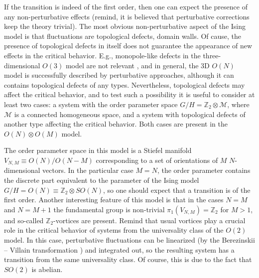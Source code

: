 \documentclass[final,twocolumn]{elsarticle}
\begin{document}
If the transition is indeed of the first order, then one can expect the presence of any non-perturbative effects (remind, it is believed that perturbative corrections keep the theory trivial). The most obvious non-perturbative aspect of the Ising model is that fluctuations are topological defects, domain walls. Of cause, the presence of topological defects in itself does not guarantee the appearance of new effects in the critical behavior. E.g., monopole-like defects in the three-dimensional $O(3)$ model are not relevant \cite{Cardy80,Antunes02}, and in general, the 3D $O(N)$ model is successfully described by perturbative approaches, although it can contains topological defects of any types. Nevertheless, topological defects may affect the critical behavior, and to test such a possibility it is useful to consider at least two cases: a system with the order parameter space $G/H=\mathbb{Z}_2\otimes \mathcal{M}$, where $\mathcal{M}$ is a connected homogeneous space, and a system with topological defects of another type affecting the critical behavior. Both cases are present in the $O(N)\otimes O(M)$ model.

The order parameter space in this model is a Stiefel manifold $V_{N,M}\equiv O(N)/O(N-M)$ corresponding to a set of orientations of $M$ $N$-dimensional vectors. In the particular case $M=N$, the order parameter contains the discrete part equivalent to the parameter of the Ising model $G/H=O(N)\equiv\mathbb{Z}_2\otimes SO(N)$, so one should expect that a transition is of the first order. Another interesting feature of this model is that in the cases $N=M$ and $N=M+1$ the fundamental group is non-trivial $\pi_1(V_{N,M})=\mathbb{Z}_2$ for $M>1$, and so-called $\mathbb{Z}_2$-vortices are present. Remind that usual vortices play a crucial role in the critical behavior of systems from the universality class of the $O(2)$ model. In this case, perturbative fluctuations can be linearized (by the Berezinskii -- Villain transformation \cite{Berezinsky70,Villain75,Kadanoff77}) and integrated out, so the resulting system has a transition from the same universality class. Of course, this is due to the fact that $SO(2)$ is abelian.
\end{document}
